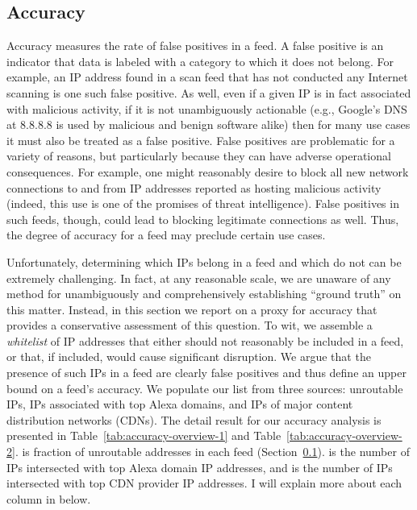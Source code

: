 \subsection{Accuracy}
\label{sec:ip-accuracy}


Accuracy measures the rate of false positives in a feed. A false
positive is an indicator that data is labeled with a category to which
it does not belong.  For example, an IP address found in a scan feed
that has not conducted any Internet scanning is one such false
positive.  As well, even if a given IP is in fact associated with
malicious activity, if it is not unambiguously actionable (e.g.,
Google's DNS at 8.8.8.8 is used by malicious and benign software
alike) then for many use cases it must also be treated as a false
positive.  False positives are problematic for a variety of reasons,
but particularly because they can have adverse operational
consequences.  For example, one might reasonably desire to block all
new network connections to and from IP addresses reported as hosting
malicious activity (indeed, this use is one of the promises of threat
intelligence). False positives in such feeds, though, could lead to
blocking legitimate connections as well.  Thus, the degree of accuracy
for a feed may preclude certain use cases.

Unfortunately, determining which IPs belong in a feed and which do not
can be extremely challenging. In fact, at any reasonable scale, we are
unaware of any method for unambiguously and comprehensively
establishing ``ground truth'' on this matter.  Instead, in this
section we report on a proxy for accuracy that provides a
conservative assessment of this question.  To wit, we assemble a
\emph{whitelist} of IP addresses that either should not reasonably be
included in a feed, or that, if included, would cause significant
disruption. We argue that the presence of such IPs in a feed are
clearly false positives and thus define an upper bound on a feed's
accuracy.  We populate our list from three sources: unroutable IPs,
IPs associated with top Alexa domains, and IPs of major content
distribution networks (CDNs). The detail result for our accuracy analysis 
is presented in Table~\ref{tab:accuracy-overview-1} and 
Table~\ref{tab:accuracy-overview-2}.
 is fraction of unroutable addresses in each feed
(Section~\ref{sec:ip-accuracy}).
 is the number of IPs intersected with top Alexa domain 
IP addresses, and  is the number of IPs intersected with 
top CDN provider IP addresses. I will explain more about each column in below.


